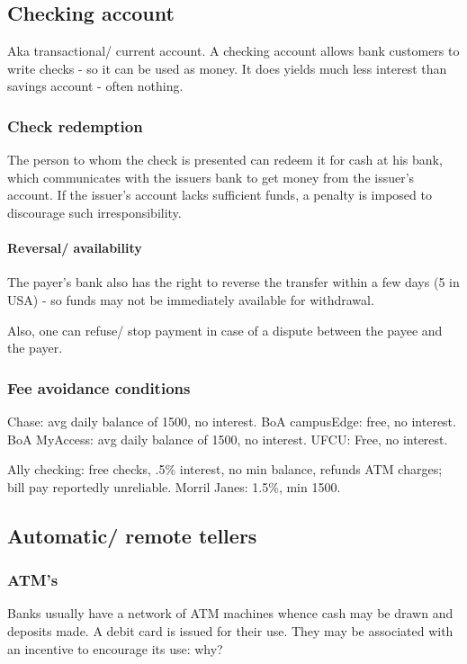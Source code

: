 \documentclass[oneside, article]{memoir}
\begin{document}
\subsection{Checking account}
Aka transactional/ current account. A checking account allows bank customers to write checks - so it can be used as money. It does yields much less interest than savings account - often nothing.

\subsubsection{Check redemption}
The person to whom the check is presented can redeem it for cash at his bank, which communicates with the issuers bank to get money from the issuer's account. If the issuer's account lacks sufficient funds, a penalty is imposed to discourage such irresponsibility.

\paragraph{Reversal/ availability}
The payer's bank also has the right to reverse the transfer within a few days (5 in USA) - so funds may not be immediately available for withdrawal.

Also, one can refuse/ stop payment in case of a dispute between the payee and the payer.

\subsubsection{Fee avoidance conditions}
Chase: avg daily balance of 1500, no interest. BoA campusEdge: free, no interest. BoA MyAccess: avg daily balance of 1500, no interest. UFCU: Free, no interest.

Ally checking: free checks, .5\% interest, no min balance, refunds ATM charges; bill pay reportedly unreliable. Morril Janes: 1.5\%, min 1500.

\subsection{Automatic/ remote tellers}
\subsubsection{ATM's}
Banks usually have a network of ATM machines whence cash may be drawn and deposits made. A debit card is issued for their use. They may be associated with an incentive to encourage its use: why?
\end{document}
